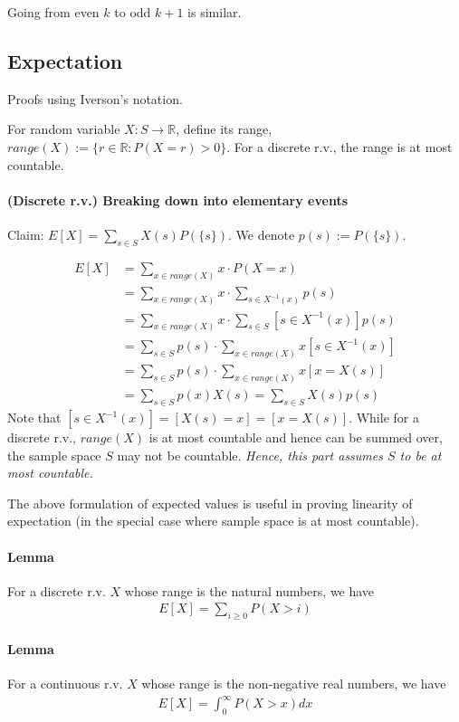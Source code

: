 \documentclass{article}
\begin{document}
Going from even $k$ to odd $k+1$ is similar.

\subsection{Expectation}
Proofs using Iverson's notation.

For random variable $X: S\rightarrow \mathbb{R}$, define its range, $range(X) := \{r\in \mathbb{R} : P(X=r) > 0\}$. For a discrete r.v., the range is at most countable.

\paragraph{(Discrete r.v.) Breaking down into elementary events} Claim: $E[X] = \sum_{s\in S}X(s)P(\{s\})$. We denote $p(s):=P(\{s\})$.

\begin{align*}
	E[X] &= \sum_{x\in range(X)}x\cdot P(X=x)\\
	&= \sum_{x\in range(X)}x\cdot \sum_{s\in X^{-1}(x)}p(s)\\
	&= \sum_{x\in range(X)}x\cdot \sum_{s\in S}[s\in X^{-1}(x)]p(s)\\
	&= \sum_{s\in S}p(s)\cdot \sum_{x\in range(X)}x[s\in X^{-1}(x)]\\
	&= \sum_{s\in S}p(s)\cdot \sum_{x\in range(X)}x[x=X(s)]\\
	&= \sum_{s\in S}p(x)X(s) = \sum_{s\in S}X(s)p(s)
\end{align*}
Note that $[s\in X^{-1}(x)] = [X(s) = x] = [x = X(s)]$. While for a discrete r.v., $range(X)$ is at most countable and hence can be summed over, the sample space $S$ may not be countable. \textit{Hence, this part assumes $S$ to be at most countable.}

The above formulation of expected values is useful in proving linearity of expectation (in the special case where sample space is at most countable).

\paragraph{Lemma} For a discrete r.v. $X$ whose range is the natural numbers, we have
\begin{align*}
	E[X] = \sum_{i\geq 0}P(X > i)
\end{align*}

\paragraph{Lemma} For a continuous r.v. $X$ whose range is the non-negative real numbers, we have
\begin{align*}
	E[X] = \int_0^{\infty} P(X > x) dx
\end{align*}
\end{document}

